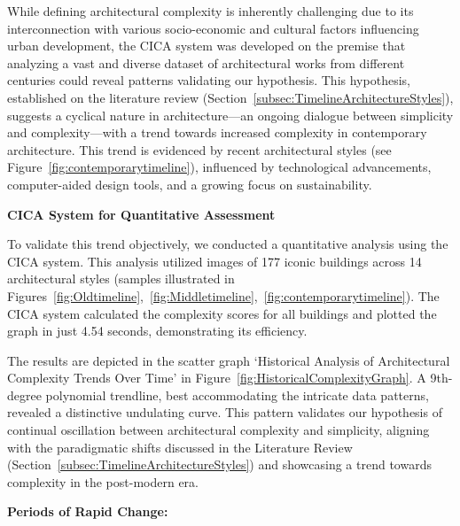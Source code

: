 %    


While defining architectural complexity is inherently challenging due to its interconnection with various socio-economic and cultural factors influencing urban development, the CICA system was developed on the premise that analyzing a vast and diverse dataset of architectural works from different centuries could reveal patterns validating our hypothesis.
This hypothesis, established on the literature review (Section~\ref{subsec:TimelineArchitectureStyles}), suggests a cyclical nature in architecture—an ongoing dialogue between simplicity and complexity—with a trend towards increased complexity in contemporary architecture.
This trend is evidenced by recent architectural styles (see Figure~\ref{fig:contemporarytimeline}), influenced by technological advancements, computer-aided design tools, and a growing focus on sustainability.

\textbf{CICA System for Quantitative Assessment}

To validate this trend objectively, we conducted a quantitative analysis using the CICA system.
This analysis utilized images of 177 iconic buildings across 14 architectural styles (samples illustrated in Figures~\ref{fig:Oldtimeline},~\ref{fig:Middletimeline},~\ref{fig:contemporarytimeline}). The CICA system calculated the complexity scores for all buildings and plotted the graph in just 4.54 seconds, demonstrating its efficiency.

The results are depicted in the scatter graph `Historical Analysis of Architectural Complexity Trends Over Time' in Figure~\ref{fig:HistoricalComplexityGraph}.
A 9th-degree polynomial trendline, best accommodating the intricate data patterns, revealed a distinctive undulating curve.
This pattern validates our hypothesis of continual oscillation between architectural complexity and simplicity, aligning with the paradigmatic shifts discussed in the Literature Review (Section~\ref{subsec:TimelineArchitectureStyles}) and showcasing a trend towards complexity in the post-modern era.

\textbf{Periods of Rapid Change:}

